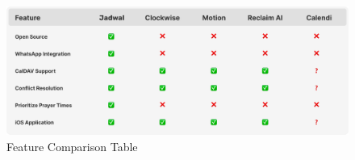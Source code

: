 \documentclass[12pt,a4paper]{report}
\begin{document}
\begin{figure}[!h]
    \centering
    \includegraphics[width=\textwidth]{images/features-table.png}
    \caption{Feature Comparison Table}
    \label{fig:features-table}
    
\end{figure}

\newpage
\end{document}
